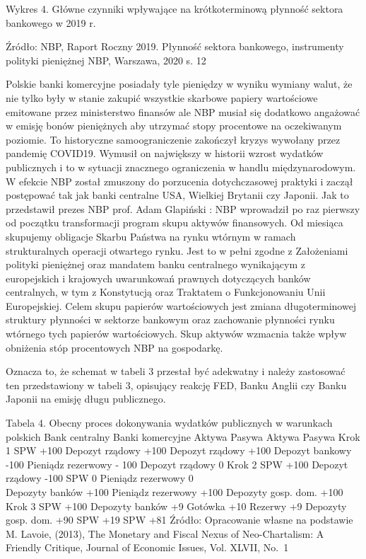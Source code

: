\documentclass[
]{book}
\begin{document}
Wykres 4. Główne czynniki wpływające na krótkoterminową płynność sektora bankowego w 2019 r.

Źródło: NBP, Raport Roczny 2019. Płynność sektora bankowego, instrumenty polityki pieniężnej NBP, Warszawa, 2020 s. 12

Polskie banki komercyjne posiadały tyle pieniędzy w wyniku wymiany walut, że nie tylko były w stanie zakupić wszystkie skarbowe papiery wartościowe emitowane przez ministerstwo finansów ale NBP musiał się dodatkowo angażować w emisję bonów pieniężnych aby utrzymać stopy procentowe na oczekiwanym poziomie.
To historyczne samoograniczenie zakończył kryzys wywołany przez pandemię COVID19. Wymusił on największy w historii wzrost wydatków publicznych i to w sytuacji znacznego ograniczenia w handlu międzynarodowym. W efekcie NBP został zmuszony do porzucenia dotychczasowej praktyki i zaczął postępować tak jak banki centralne USA, Wielkiej Brytanii czy Japonii. Jak to przedstawił prezes NBP prof. Adam Glapiński :
NBP wprowadził po raz pierwszy od początku transformacji program skupu aktywów finansowych. Od miesiąca skupujemy obligacje Skarbu Państwa na rynku wtórnym w ramach strukturalnych operacji otwartego rynku. Jest to w pełni zgodne z Założeniami polityki pieniężnej oraz mandatem banku centralnego wynikającym z europejskich i krajowych uwarunkowań prawnych dotyczących banków centralnych, w tym z Konstytucją oraz Traktatem o Funkcjonowaniu Unii Europejskiej. Celem skupu papierów wartościowych jest zmiana długoterminowej struktury płynności w sektorze bankowym oraz zachowanie płynności rynku wtórnego tych papierów wartościowych. Skup aktywów wzmacnia także wpływ obniżenia stóp procentowych NBP na gospodarkę.

Oznacza to, że schemat w tabeli 3 przestał być adekwatny i należy zastosować ten przedstawiony w tabeli 3, opisujący reakcję FED, Banku Anglii czy Banku Japonii na emisję długu publicznego.

Tabela 4. Obecny proces dokonywania wydatków publicznych w warunkach polskich
Bank centralny Banki komercyjne
Aktywa Pasywa Aktywa Pasywa
Krok 1 SPW +100 Depozyt rządowy +100
Depozyt rządowy +100
Depozyt bankowy -100 Pieniądz rezerwowy - 100 Depozyt rządowy 0
Krok 2 SPW +100 Depozyt rządowy -100 SPW 0
Pieniądz rezerwowy 0\\
Depozyty banków +100 Pieniądz rezerwowy +100 Depozyty gosp. dom. +100
Krok 3 SPW +100
Depozyty banków +9
Gotówka +10 Rezerwy +9 Depozyty gosp. dom. +90
SPW +19 SPW +81
Źródło: Opracowanie własne na podstawie M. Lavoie, (2013), The Monetary and Fiscal Nexus of Neo-Chartalism: A Friendly Critique, Journal of Economic Issues, Vol. XLVII, No.~1
\end{document}
